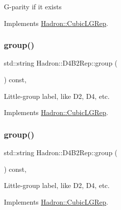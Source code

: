 G-\/parity if it exists 

Implements \mbox{\hyperlink{structHadron_1_1CubicLGRep_ace26f7b2d55e3a668a14cb9026da5231}{Hadron\+::\+Cubic\+L\+G\+Rep}}.

\mbox{\label{structHadron_1_1D4B2Rep_a1d6852d7785e4c17d4ca5ce9c63edda4}} 
\subsubsection{\texorpdfstring{group()}{group()}\hspace{0.1cm}{\footnotesize\ttfamily [1/5]}}
{\footnotesize\ttfamily std\+::string Hadron\+::\+D4\+B2\+Rep\+::group (\begin{DoxyParamCaption}{ }\end{DoxyParamCaption}) const\hspace{0.3cm}{\ttfamily [inline]}, {\ttfamily [virtual]}}

Little-\/group label, like D2, D4, etc. 

Implements \mbox{\hyperlink{structHadron_1_1CubicLGRep_a9bdb14b519a611d21379ed96a3a9eb41}{Hadron\+::\+Cubic\+L\+G\+Rep}}.

\mbox{\label{structHadron_1_1D4B2Rep_a1d6852d7785e4c17d4ca5ce9c63edda4}} 
\subsubsection{\texorpdfstring{group()}{group()}\hspace{0.1cm}{\footnotesize\ttfamily [2/5]}}
{\footnotesize\ttfamily std\+::string Hadron\+::\+D4\+B2\+Rep\+::group (\begin{DoxyParamCaption}{ }\end{DoxyParamCaption}) const\hspace{0.3cm}{\ttfamily [inline]}, {\ttfamily [virtual]}}

Little-\/group label, like D2, D4, etc. 

Implements \mbox{\hyperlink{structHadron_1_1CubicLGRep_a9bdb14b519a611d21379ed96a3a9eb41}{Hadron\+::\+Cubic\+L\+G\+Rep}}.

\mbox{\label{structHadron_1_1D4B2Rep_a1d6852d7785e4c17d4ca5ce9c63edda4}} 
